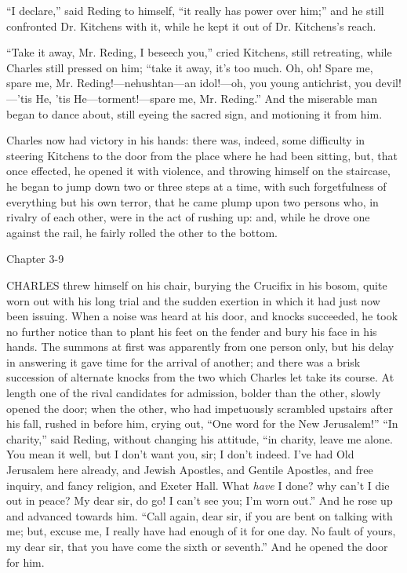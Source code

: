 ``I declare,'' said Reding to himself, ``it really has
power over him;'' and he still confronted Dr. Kitchens with it,
while he kept it out of Dr. Kitchens's reach.

``Take it away, Mr. Reding, I beseech you,'' cried
Kitchens, still retreating, while Charles still pressed on him;
``take it away, it's too much. Oh, oh! Spare me, spare me, Mr.
Reding!—nehushtan—an idol!—oh, you young antichrist, you devil!—'tis
He, 'tis He—torment!—spare me, Mr. Reding.'' And the miserable
man began to dance about, still eyeing the sacred sign, and motioning
it from him.

Charles now had victory in his hands: there was, indeed, some
difficulty in steering Kitchens to the door from the place where he
had been sitting, but, that once effected, he opened it with violence,
and throwing himself on the staircase, he began to jump down two or
three steps at a time, with such forgetfulness of everything but his
own terror, that he came plump upon two persons who, in rivalry of
each other, were in the act of rushing up: and, while he drove one
against the rail, he fairly rolled the other to the bottom.

Chapter 3-9


CHARLES threw himself on his chair,
burying the Crucifix in his bosom, quite worn out with his long trial
and the sudden exertion in which it had just now been issuing. When a
noise was heard at his door, and knocks succeeded, he took no further
notice than to plant his feet on the fender and bury his face in his
hands. The summons at first was apparently from one person only, but
his delay in answering it gave time for the arrival of another; and
there was a brisk succession of alternate knocks from the two which
Charles let take its course. At length one of the rival candidates for
admission, bolder than the other, slowly opened the door; when the
other, who had impetuously scrambled upstairs after his fall, rushed
in before him, crying out, ``One word for the New Jerusalem!''
``In charity,'' said Reding, without changing his attitude,
``in charity, leave me alone. You mean it well, but I don't want
you, sir; I don't indeed. I've had Old Jerusalem here already, and
Jewish Apostles, and Gentile Apostles, and free inquiry, and fancy
religion, and Exeter Hall. What \emph{have} I done? why can't I die out in
peace? My dear sir, do go! I can't see you; I'm worn out.''
And he rose up and advanced towards him. ``Call again, dear sir,
if you are bent on talking with me; but, excuse me, I really have had
enough of it for one day. No fault of yours, my dear sir, that you
have come the sixth or seventh.'' And he opened the door for him.

